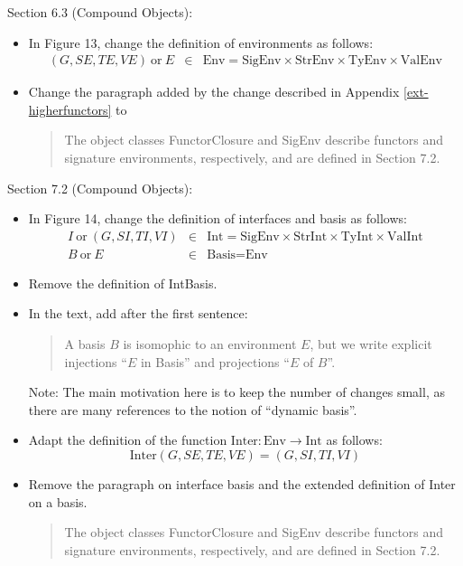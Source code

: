 \documentclass[twoside,titlepage]{article}
\begin{document}
\begin{appendix}
Section 6.3 (Compound Objects):
\begin{itemize}
\item In Figure 13, change the definition of environments as follows:
  \begin{eqnarray*}
  (G,\mathit{SE},\mathit{TE},\mathit{VE})~\mbox{or}~E &\in& \mbox{Env} = \mbox{SigEnv}\times\mbox{StrEnv}\times\mbox{TyEnv}\times\mbox{ValEnv}
  \end{eqnarray*}

\item Change the paragraph added by the change described in Appendix \ref{ext-higherfunctors} to
  \begin{quote}
  The object classes FunctorClosure and SigEnv describe functors and signature environments, respectively, and are defined in Section 7.2.
  \end{quote}
\end{itemize}

Section 7.2 (Compound Objects):
\begin{itemize}
\item In Figure 14, change the definition of interfaces and basis as follows:
  \begin{eqnarray*}
  I~\mbox{or}~(G,\mathit{SI},\mathit{TI},\mathit{VI}) &\in& \mbox{Int} = \mbox{SigEnv}\times\mbox{StrInt}\times\mbox{TyInt}\times\mbox{ValInt} \\
  B~\mbox{or}~E &\in& \mbox{Basis} = \mbox{Env}
  \end{eqnarray*}

\item Remove the definition of IntBasis.

\item In the text, add after the first sentence:
  \begin{quote}
  A basis $B$ is isomophic to an environment $E$, but we write explicit injections ``$E$ in Basis'' and projections ``$E$ of $B$''.
  \end{quote}
  Note: The main motivation here is to keep the number of changes small, as there are many references to the notion of ``dynamic basis''.

\item Adapt the definition of the function $\mbox{Inter}:\mbox{Env}\to\mbox{Int}$ as follows:
  $$
  \mbox{Inter}(G,\mathit{SE},\mathit{TE},\mathit{VE}) = (G,\mathit{SI},\mathit{TI},\mathit{VI})
  $$

\item Remove the paragraph on interface basis and the extended definition of Inter on a basis.
  \begin{quote}
  The object classes FunctorClosure and SigEnv describe functors and signature environments, respectively, and are defined in Section 7.2.
  \end{quote}


\end{itemize}
\end{appendix}
\end{document}
